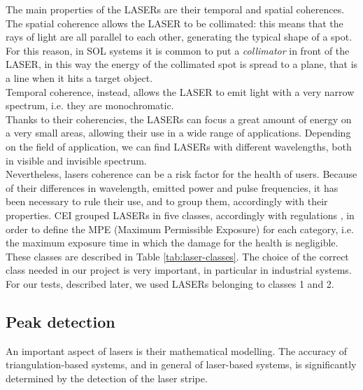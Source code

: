 The main properties of the \acs{LASER}s are their temporal and spatial coherences. The spatial coherence allows the \acs{LASER} to be collimated: this means that the rays of light are all parallel to each other, generating the typical shape of a spot. For this reason, in \acs{SOL} systems it is common to put a \textit{collimator} in front of the \acs{LASER}, in this way the energy of the collimated spot is spread to a plane, that is a line when it hits a target object. \\
Temporal coherence, instead, allows the \acs{LASER} to emit light with a very narrow spectrum, i.e. they are monochromatic. \\
Thanks to their coherencies, the \acs{LASER}s can focus a great amount of energy on a very small areas, allowing their use in a wide range of applications. Depending on the field of application, we can find \acs{LASER}s with different wavelengths, both in visible and invisible spectrum. \\

  
Nevertheless, lasers coherence can be a risk factor for the health of users. Because of their differences in wavelength, emitted power and pulse frequencies, it has been necessary to rule their use, and to group them, accordingly with their properties. \acs{CEI} grouped \acs{LASER}s in five classes, accordingly with regulations \cite{cei:76-2}, in order to define the \acs{MPE} (Maximum Permissible Exposure) for each category, i.e. the maximum exposure time in which the damage for the health is negligible. These classes are described in Table \ref{tab:laser-classes}. The choice of the correct class needed in our project is very important, in particular in industrial systems. For our tests, described later, we used \acs{LASER}s belonging to classes 1 and 2. \\

\subsection{Peak detection}
\label{subsec:peak-detection}
An important aspect of lasers is their mathematical modelling. The accuracy of triangulation-based systems, and in general of laser-based systems, is significantly determined by the detection of the laser stripe. \\

